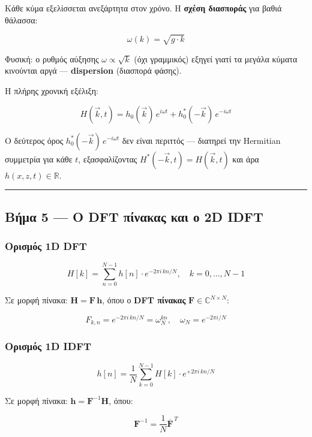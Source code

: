 \documentclass[a4paper, 11pt]{article}
\begin{document}
Κάθε κύμα εξελίσσεται ανεξάρτητα στον χρόνο. Η \textbf{σχέση διασποράς}
για βαθιά θάλασσα:

\[\boxed{\omega(k) = \sqrt{g \cdot k}}\]

Φυσική: ο ρυθμός αύξησης \(\omega \propto \sqrt{k}\) (όχι γραμμικός)
εξηγεί γιατί τα μεγάλα κύματα κινούνται αργά --- \textbf{dispersion}
(διασπορά φάσης).

Η πλήρης χρονική εξέλιξη:

\[\boxed{H(\vec{k}, t) = h_0(\vec{k})\,e^{i\omega t} + h_0^*(-\vec{k})\,e^{-i\omega t}}\]

Ο δεύτερος όρος \(h_0^*(-\vec{k})\,e^{-i\omega t}\) δεν είναι περιττός
--- διατηρεί την Hermitian συμμετρία για κάθε \(t\), εξασφαλίζοντας
\(H^*(-\vec{k},t) = H(\vec{k},t)\) και άρα \(h(x,z,t) \in \mathbb{R}\).

\begin{center}\rule{0.5\linewidth}{0.5pt}\end{center}

\subsection{Βήμα 5 --- Ο DFT πίνακας και ο 2D
IDFT}\label{ux3b2ux3aeux3bcux3b1-5-ux3bf-dft-ux3c0ux3afux3bdux3b1ux3baux3b1ux3c2-ux3baux3b1ux3b9-ux3bf-2d-idft}

\subsubsection{Ορισμός 1D
DFT}\label{ux3bfux3c1ux3b9ux3c3ux3bcux3ccux3c2-1d-dft}

\[H[k] = \sum_{n=0}^{N-1} h[n] \cdot e^{-2\pi i\, kn/N}, \quad k = 0, \ldots, N-1\]

Σε μορφή πίνακα: \(\mathbf{H} = \mathbf{F}\,\mathbf{h}\), όπου ο
\textbf{DFT πίνακας} \(\mathbf{F} \in \mathbb{C}^{N\times N}\):

\[F_{k,n} = e^{-2\pi i\,kn/N} = \omega_N^{kn}, \quad \omega_N = e^{-2\pi i/N}\]

\subsubsection{Ορισμός 1D
IDFT}\label{ux3bfux3c1ux3b9ux3c3ux3bcux3ccux3c2-1d-idft}

\[h[n] = \frac{1}{N} \sum_{k=0}^{N-1} H[k] \cdot e^{+2\pi i\, kn/N}\]

Σε μορφή πίνακα: \(\mathbf{h} = \mathbf{F}^{-1}\mathbf{H}\), όπου:

\[\mathbf{F}^{-1} = \frac{1}{N}\overline{\mathbf{F}}^{\,T}\]
\end{document}
